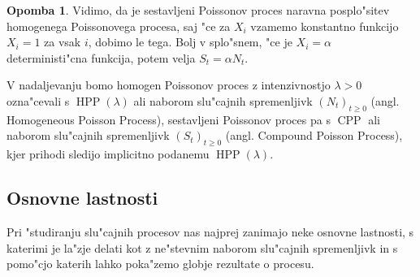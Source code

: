 \documentclass[12pt, a4paper, reqno]{amsart}
\theoremstyle{definition}
\newtheorem{opomba}[definicija]{Opomba}
\theoremstyle{plain}
\newcommand{\1}{\mathds{1}}
\DeclareMathOperator{\HPP}{HPP}
\DeclareMathOperator{\CPP}{CPP}
\begin{document}
    \begin{opomba}
        Vidimo, da je sestavljeni Poissonov proces naravna posplo"sitev homogenega Poissonovega procesa, saj "ce za
        $X_i$ vzamemo konstantno funkcijo $X_i = 1$ za vsak $i$, dobimo le tega. Bolj v splo"snem, "ce je 
        $X_i = \alpha$ deterministi"cna funkcija, potem velja $S_t = \alpha N_t$.
        \label{op:CPPHPPPovezava}
    \end{opomba}

    V nadaljevanju bomo homogen Poissonov proces z intenzivnostjo $\lambda >0$ ozna"cevali s $\HPP(\lambda)$ 
    ali naborom slu"cajnih spremenljivk $(N_t)_{t\geq0}$ (angl. Homogeneous Poisson Process), 
    sestavljeni Poissonov proces pa s $\CPP$ ali naborom slu"cajnih spremenljivk $(S_t)_{t\geq0}$ 
    (angl. Compound Poisson Process), kjer prihodi sledijo implicitno podanemu $\HPP(\lambda)$. 

    \subsection{Osnovne lastnosti}
    
        Pri "studiranju slu"cajnih procesov nas najprej zanimajo neke osnovne lastnosti, s katerimi 
        je la"zje delati kot z ne"stevnim naborom slu"cajnih spremenljivk in s pomo"cjo katerih 
        lahko poka"zemo globje rezultate o procesu. 
\end{document}
